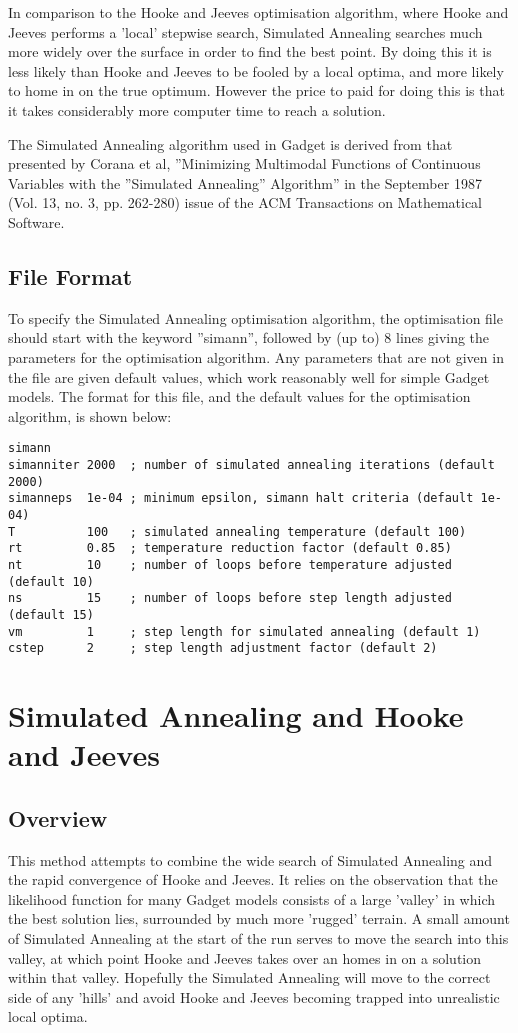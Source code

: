 \documentclass [a4paper, 10pt]{book}
\begin{document}
\bigskip
In comparison to the Hooke and Jeeves optimisation algorithm, where Hooke and Jeeves performs a 'local' stepwise search, Simulated Annealing searches much more widely over the surface in order to find the best point.  By doing this it is less likely than Hooke and Jeeves to be fooled by a local optima, and more likely to home in on the true optimum.  However the price to paid for doing this is that it takes considerably more computer time to reach a solution.

\bigskip
The Simulated Annealing algorithm used in Gadget is derived from that presented by Corana et al, ''Minimizing Multimodal Functions of Continuous Variables with the ''Simulated Annealing'' Algorithm'' in the September 1987 (Vol. 13, no. 3, pp. 262-280) issue of the ACM Transactions on Mathematical Software.

\subsection{File Format}
To specify the Simulated Annealing optimisation algorithm, the optimisation file should start with the keyword ''simann'', followed by (up to) 8 lines giving the parameters for the optimisation algorithm.  Any parameters that are not given in the file are given default values, which work reasonably well for simple Gadget models.  The format for this file, and the default values for the optimisation algorithm, is shown below:

{\small\begin{verbatim}
simann
simanniter 2000  ; number of simulated annealing iterations (default 2000)
simanneps  1e-04 ; minimum epsilon, simann halt criteria (default 1e-04)
T          100   ; simulated annealing temperature (default 100)
rt         0.85  ; temperature reduction factor (default 0.85)
nt         10    ; number of loops before temperature adjusted (default 10)
ns         15    ; number of loops before step length adjusted (default 15)
vm         1     ; step length for simulated annealing (default 1)
cstep      2     ; step length adjustment factor (default 2)
\end{verbatim}}

\section{Simulated Annealing and Hooke and Jeeves}\label{sec:simannandhooke}
\subsection{Overview}
This method attempts to combine the wide search of Simulated Annealing and the rapid convergence of Hooke and Jeeves.  It relies on the observation that the likelihood function for many Gadget models consists of a large 'valley' in which the best solution lies, surrounded by much more 'rugged' terrain.  A small amount of Simulated Annealing at the start of the run serves to move the search into this valley, at which point Hooke and Jeeves takes over an homes in on a solution within that valley.  Hopefully the Simulated Annealing will move to the correct side of any 'hills' and avoid Hooke and Jeeves becoming trapped into unrealistic local optima.
\end{document}
